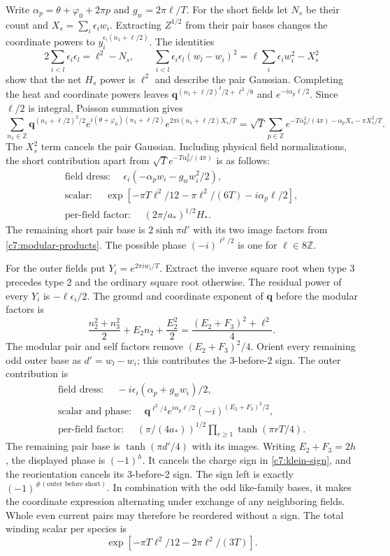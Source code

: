 Write $\alpha_p=\theta+\varphi_0+2\pi p$ and $g_w=2\pi\ell/T$.  For the
short fields let $N_s$ be their count and $X_s=\sum_i\epsilon_iw_i$.
Extracting $Z^{1/2}$ from their pair bases changes the coordinate powers to
$y_i^{\epsilon_i(n_1+\ell/2)}$.  The identities
\[
2\sum_{i<l}\epsilon_i\epsilon_l=\ell^2-N_s,
\qquad
\sum_{i<l}\epsilon_i\epsilon_l(w_l-w_i)^2
=\ell\sum_i\epsilon_iw_i^2-X_s^2
\]
show that the net $H_s$ power is $\ell^2$ and describe the pair Gaussian.
Completing the heat and coordinate powers leaves
$\mathbf q^{(n_1+\ell/2)^2/2+\ell^2/8}$ and
$e^{-i\alpha_p\ell/2}$.  Since $\ell/2$ is integral, Poisson summation gives
\[
\sum_{n_1\in\mathbb Z}
\mathbf q^{(n_1+\ell/2)^2/2}
 e^{i(\theta+\varphi_0)(n_1+\ell/2)}
 e^{2\pi i(n_1+\ell/2)X_s/T}
=\sqrt T\sum_{p\in\mathbb Z}
 e^{-T\alpha_p^2/(4\pi)-\alpha_pX_s-\pi X_s^2/T}.
\]
The $X_s^2$ term cancels the pair Gaussian.  Including physical field
normalizations, the short contribution apart from
$\sqrt T e^{-T\alpha_p^2/(4\pi)}$ is as follows:
\[
\begin{gathered}
\text{field dress: }\quad
\epsilon_i(-\alpha_pw_i-g_ww_i^2/2),\\
\text{scalar: }\quad
\exp[-\pi T\ell^2/12-\pi\ell^2/(6T)-i\alpha_p\ell/2],\\
\text{per-field factor: }\quad (2\pi/a_*)^{1/2}H_*.
\end{gathered}
\]
The remaining short pair base is $2\sinh\pi d'$ with its two image factors
from \eqref{c7:modular-products}.  The possible phase
$(-i)^{\ell^2/2}$ is one for $\ell\in8\mathbb Z$.

For the outer fields put $Y_i=e^{2\pi iw_i/T}$.  Extract the inverse square
root when type 3 precedes type 2 and the ordinary square root otherwise.
The residual power of every $Y_i$ is $-\ell\epsilon_i/2$.  The ground and
coordinate exponent of $\mathbf q$ before the modular factors is
\[
\frac{n_2^2+n_3^2}{2}+E_2n_2+\frac{E_2^2}{2}
=\frac{(E_2+F_3)^2+\ell^2}{4}.
\]
The modular pair and self factors remove $(E_2+F_3)^2/4$.  Orient every
remaining odd outer base as $d'=w_l-w_i$; this contributes the
3-before-2 sign.  The outer contribution is
\[
\begin{gathered}
\text{field dress: }\quad -i\epsilon_i(\alpha_p+g_ww_i)/2,\\
\text{scalar and phase: }\quad
\mathbf q^{\ell^2/4}e^{i\alpha_p\ell/2}
(-i)^{(E_2+F_3)^2/2},\\
\text{per-field factor: }\quad
(\pi/(4a_*))^{1/2}\prod_{r\ge1}\tanh(\pi rT/4).
\end{gathered}
\]
The remaining pair base is $\tanh(\pi d'/4)$ with its images.
Writing $E_2+F_3=2h$, the displayed phase is $(-1)^h$.  It cancels the
charge sign in \eqref{c7:klein-sign}, and the reorientation cancels its
3-before-2 sign.  The sign left is exactly
$(-1)^{\#(\text{outer before short})}$.  In combination with the odd
like-family bases, it makes the coordinate expression alternating under
exchange of any neighboring fields.  Whole even current pairs may therefore
be reordered without a sign.  The total winding scalar per species is
\begin{equation}\label{c7:modular-winding}
\exp[-\pi T\ell^2/12-2\pi\ell^2/(3T)].
\end{equation}

